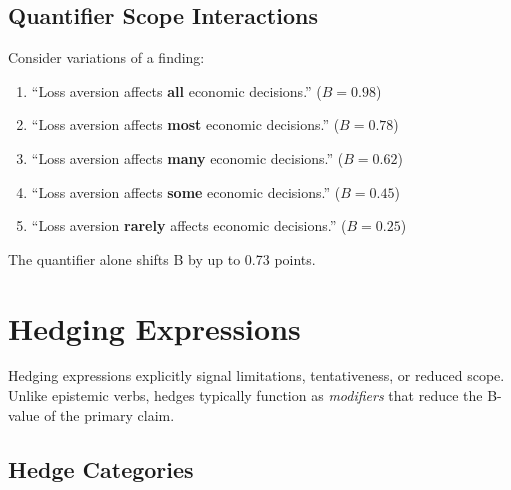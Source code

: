 \documentclass[11pt,a4paper]{article}
\theoremstyle{remark}
\begin{document}
\subsection{Quantifier Scope Interactions}

\begin{examplebox}[title={Quantifier Impact on Claim Strength}]
Consider variations of a finding:

\begin{enumerate}
    \item ``Loss aversion affects \textbf{all} economic decisions.'' ($B = 0.98$)
    \item ``Loss aversion affects \textbf{most} economic decisions.'' ($B = 0.78$)
    \item ``Loss aversion affects \textbf{many} economic decisions.'' ($B = 0.62$)
    \item ``Loss aversion affects \textbf{some} economic decisions.'' ($B = 0.45$)
    \item ``Loss aversion \textbf{rarely} affects economic decisions.'' ($B = 0.25$)
\end{enumerate}

The quantifier alone shifts B by up to 0.73 points.
\end{examplebox}


\section{Hedging Expressions}
\label{sec:hedging}

Hedging expressions explicitly signal limitations, tentativeness, or reduced scope. Unlike epistemic verbs, hedges typically function as \textit{modifiers} that reduce the B-value of the primary claim.

\subsection{Hedge Categories}
\end{document}
